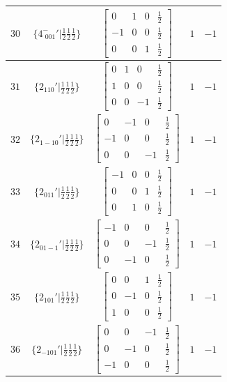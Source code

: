 \documentclass[fleqn,8pt]{jsarticle}
\begin{document}
\begin{longtable}{ccccc}
$ 30 $ & $ \{4^{-}_{\,\,001}{}'|\frac{1}{2} \frac{1}{2} \frac{1}{2}\} $ & $ \begin{bmatrix} 0 & 1 & 0 & \frac{1}{2} \\ -1 & 0 & 0 & \frac{1}{2} \\ 0 & 0 & 1 & \frac{1}{2} \end{bmatrix} $ & $ 1 $ & $ -1 $ \\ \hline
$ 31 $ & $ \{2{}_{110}{}'|\frac{1}{2} \frac{1}{2} \frac{1}{2}\} $ & $ \begin{bmatrix} 0 & 1 & 0 & \frac{1}{2} \\ 1 & 0 & 0 & \frac{1}{2} \\ 0 & 0 & -1 & \frac{1}{2} \end{bmatrix} $ & $ 1 $ & $ -1 $ \\ \hline
$ 32 $ & $ \{2{}_{1-10}{}'|\frac{1}{2} \frac{1}{2} \frac{1}{2}\} $ & $ \begin{bmatrix} 0 & -1 & 0 & \frac{1}{2} \\ -1 & 0 & 0 & \frac{1}{2} \\ 0 & 0 & -1 & \frac{1}{2} \end{bmatrix} $ & $ 1 $ & $ -1 $ \\ \hline
$ 33 $ & $ \{2{}_{011}{}'|\frac{1}{2} \frac{1}{2} \frac{1}{2}\} $ & $ \begin{bmatrix} -1 & 0 & 0 & \frac{1}{2} \\ 0 & 0 & 1 & \frac{1}{2} \\ 0 & 1 & 0 & \frac{1}{2} \end{bmatrix} $ & $ 1 $ & $ -1 $ \\ \hline
$ 34 $ & $ \{2{}_{01-1}{}'|\frac{1}{2} \frac{1}{2} \frac{1}{2}\} $ & $ \begin{bmatrix} -1 & 0 & 0 & \frac{1}{2} \\ 0 & 0 & -1 & \frac{1}{2} \\ 0 & -1 & 0 & \frac{1}{2} \end{bmatrix} $ & $ 1 $ & $ -1 $ \\ \hline
$ 35 $ & $ \{2{}_{101}{}'|\frac{1}{2} \frac{1}{2} \frac{1}{2}\} $ & $ \begin{bmatrix} 0 & 0 & 1 & \frac{1}{2} \\ 0 & -1 & 0 & \frac{1}{2} \\ 1 & 0 & 0 & \frac{1}{2} \end{bmatrix} $ & $ 1 $ & $ -1 $ \\ \hline
$ 36 $ & $ \{2{}_{-101}{}'|\frac{1}{2} \frac{1}{2} \frac{1}{2}\} $ & $ \begin{bmatrix} 0 & 0 & -1 & \frac{1}{2} \\ 0 & -1 & 0 & \frac{1}{2} \\ -1 & 0 & 0 & \frac{1}{2} \end{bmatrix} $ & $ 1 $ & $ -1 $ \\ \hline

\end{longtable}
\end{document}
